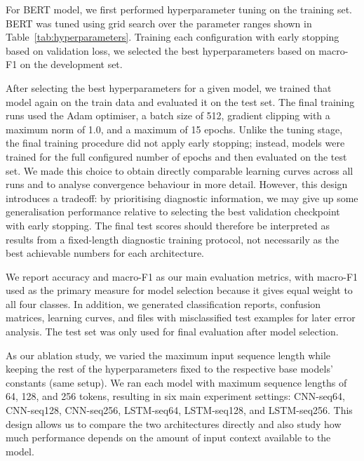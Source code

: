 For BERT model, we first performed hyperparameter tuning on the training set. BERT was tuned using grid search over the parameter ranges shown in Table~\ref{tab:hyperparameters}. Training each configuration with early stopping based on validation loss, we selected the best hyperparameters based on macro-F1 on the development set. 


After selecting the best hyperparameters for a given model, we trained that model again on the train data and evaluated it on the test set. The final training runs used the Adam optimiser, a batch size of 512, gradient clipping with a maximum norm of 1.0, and a maximum of 15 epochs. Unlike the tuning stage, the final training procedure did not apply early stopping; instead, models were trained for the full configured number of epochs and then evaluated on the test set. We made this choice to obtain directly comparable learning curves across all runs and to analyse convergence behaviour in more detail. However, this design introduces a tradeoff: by prioritising diagnostic information, we may give up some generalisation performance relative to selecting the best validation checkpoint with early stopping. The final test scores should therefore be interpreted as results from a fixed-length diagnostic training protocol, not necessarily as the best achievable numbers for each architecture.

We report accuracy and macro-F1 as our main evaluation metrics, with macro-F1 used as the primary measure for model selection because it gives equal weight to all four classes. In addition, we generated classification reports, confusion matrices, learning curves, and files with misclassified test examples for later error analysis. The test set was only used for final evaluation after model selection.

As our ablation study, we varied the maximum input sequence length while keeping the rest of the hyperparameters fixed to the respective base models' constants (same setup). We ran each model with maximum sequence lengths of 64, 128, and 256 tokens, resulting in six main experiment settings: CNN-seq64, CNN-seq128, CNN-seq256, LSTM-seq64, LSTM-seq128, and LSTM-seq256. This design allows us to compare the two architectures directly and also study how much performance depends on the amount of input context available to the model.
